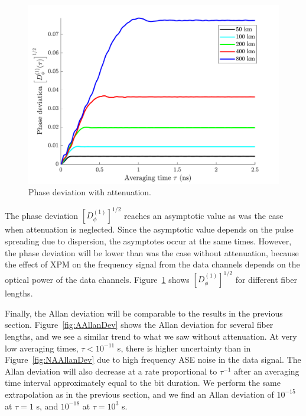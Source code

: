 %
\begin{figure}[htb]
	\raggedright
	\includegraphics[scale=0.8]{img/APhaseStability}
	\renewcommand{\baselinestretch}{1}
	\small\normalsize
	\caption{Phase deviation with attenuation.} \label{fig:APhaseStability}
\end{figure}
\renewcommand{\baselinestretch}{2}
\small\normalsize%

The phase deviation $\left[D^{(1)}_\phi\right]^{1/2}$ reaches an asymptotic value as was the case when attenuation is neglected. Since the asymptotic value depends on the pulse spreading due to dispersion, the asymptotes occur at the same times. However, the phase deviation will be lower than was the case without attenuation, because the effect of XPM on the frequency signal from the data channels depends on the optical power of the data channels. Figure~\ref{fig:APhaseStability} shows $\left[D^{(1)}_\phi\right]^{1/2}$ for different fiber lengths.

Finally, the Allan deviation will be comparable to the results in the previous section. Figure~\ref{fig:AAllanDev} shows the Allan deviation for several fiber lengths, and we see a similar trend to what we saw without attenuation. At very low averaging times, $\tau < 10^{-11}$ s, there is higher uncertainty than in Figure~\ref{fig:NAAllanDev} due to high frequency ASE noise in the data signal. The Allan deviation will also decrease at a rate proportional to $\tau^{-1}$ after an averaging time interval approximately equal to the bit duration. We perform the same extrapolation as in the previous section, and we find an Allan deviation of $10^{-15}$ at $\tau=1$ s, and $10^{-18}$ at $\tau=10^3$ s.

